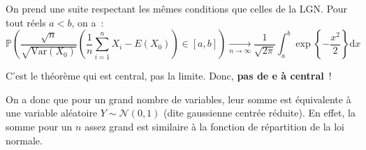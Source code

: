 \documentclass[a4paper, titlepage]{article}
\begin{document}
	\begin{thm}
		On prend une suite respectant les mêmes conditions que celles de la LGN. Pour tout réels $a<b$, on a~:
		$$ \mathbb{P}\left(\frac{\sqrt n}{\sqrt{\mathrm{Var}(X_0)}} \left(\frac{1}{n}\sum_{i=1}^{n} X_i-E(X_0) \right) \in [a,b] \right) \xrightarrow[n \to \infty]{} \frac{1}{\sqrt{2 \pi}}\int^b_a \exp\left\{ -\frac{x^2}{2} \right\} \mathrm{d}x $$
	\end{thm}
	C'est le théorème qui est central, pas la limite. Donc, \textbf{pas de e à central}~!

	On a donc que pour un grand nombre de variables, leur somme est équivalente à une variable aléatoire $Y\sim\mathcal{N}(0,1)$ (dite gaussienne centrée réduite).
	En effet, la somme pour un $n$ assez grand est similaire à la fonction de répartition de la loi normale.
\end{document}
